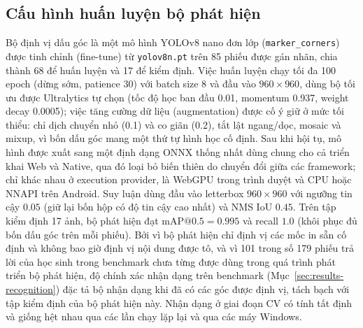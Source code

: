 \documentclass[conference]{IEEEtran}
\begin{document}
\subsection{Cấu hình huấn luyện bộ phát hiện}
Bộ định vị dấu góc là một mô hình YOLOv8 nano đơn lớp (\texttt{marker\_corners})
được tinh chỉnh (fine-tune) từ \texttt{yolov8n.pt} trên 85 phiếu được gán nhãn,
chia thành 68 để huấn luyện và 17 để kiểm định. Việc huấn luyện chạy tối đa 100
epoch (dừng sớm, patience 30) với batch size 8 và đầu vào $960\times960$, dùng bộ
tối ưu được Ultralytics tự chọn (tốc độ học ban đầu 0.01, momentum 0.937, weight
decay 0.0005); việc tăng cường dữ liệu (augmentation) được cố ý giữ ở mức tối
thiểu: chỉ dịch chuyển nhỏ (0.1) và co giãn (0.2), tắt lật ngang/dọc, mosaic và
mixup, vì bốn dấu góc mang một thứ tự hình học cố định. Sau khi hội tụ, mô hình
được xuất sang một định dạng ONNX thống nhất dùng chung cho cả triển khai Web và
Native, qua đó loại bỏ biến thiên do chuyển đổi giữa các framework; chỉ khác nhau
ở execution provider, là WebGPU trong trình duyệt và CPU hoặc NNAPI trên Android.
Suy luận dùng đầu vào letterbox $960\times960$ với ngưỡng tin cậy $0.05$ (giữ lại
bốn hộp có độ tin cậy cao nhất) và NMS IoU $0.45$. Trên tập kiểm định 17 ảnh, bộ
phát hiện đạt $\mathrm{mAP}@0.5{=}0.995$ và recall $1.0$ (khôi phục đủ bốn dấu góc
trên mỗi phiếu). Bởi vì bộ phát hiện chỉ định vị các mốc in sẵn cố định và không
bao giờ định vị nội dung được tô, và vì 101 trong số 179 phiếu trả lời của học
sinh trong benchmark chưa từng được dùng trong quá trình phát triển bộ phát hiện,
độ chính xác nhận dạng trên benchmark (Mục~\ref{sec:results-recognition}) đặc tả
bộ nhận dạng khi đã có các góc được định vị, tách bạch với tập kiểm định của bộ
phát hiện này. Nhận dạng ở giai đoạn CV có tính tất định và giống hệt nhau qua các
lần chạy lặp lại và qua các máy Windows.
\end{document}
